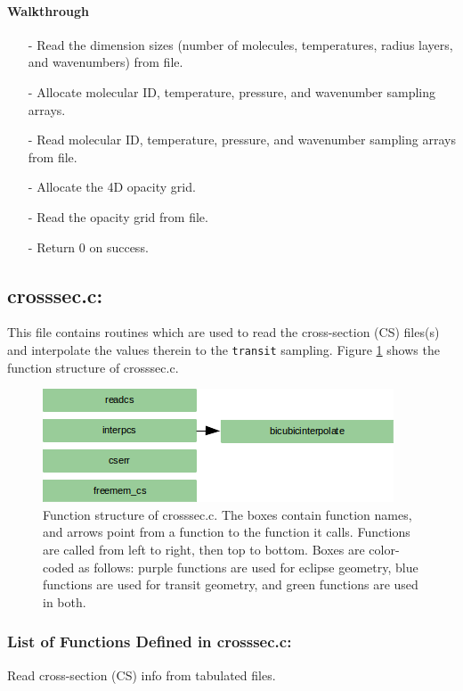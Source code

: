 \documentclass[letterpaper,12pt]{article}
\begin{document}
\paragraph{Walkthrough}
\begin{enumerate}[leftmargin=10pt, noitemsep, parsep=0pt, topsep=0ex]
\item[-] Read the dimension sizes (number of molecules, temperatures, radius layers, and wavenumbers) from file.
\item[-] Allocate molecular ID, temperature, pressure, and wavenumber sampling arrays.
\item[-] Read molecular ID, temperature, pressure, and wavenumber sampling arrays from file.
\item[-] Allocate the 4D opacity grid.
\item[-] Read the opacity grid from file.
\item[-] Return 0 on success.
\end{enumerate}

\newpage
\subsection{crosssec.c:}
This file contains routines which are used to read the cross-section (CS) files(s) and interpolate the values therein to the {\tt transit} sampling. Figure \ref{fig:crosssec} shows the function structure of crosssec.c.

\begin{figure}
\includegraphics{fig/crosssec}
\caption{Function structure of crosssec.c. The boxes contain function names, and arrows point from a function to the function it calls. Functions are called from left to right, then top to bottom.  Boxes are color-coded as follows:  purple functions are used for eclipse geometry, blue functions are used for transit geometry, and green functions are used in both.}
\label{fig:crosssec}
\end{figure}

\subsubsection{List of Functions Defined in crosssec.c:}
Read cross-section (CS) info from tabulated files. \newline
\end{document}
